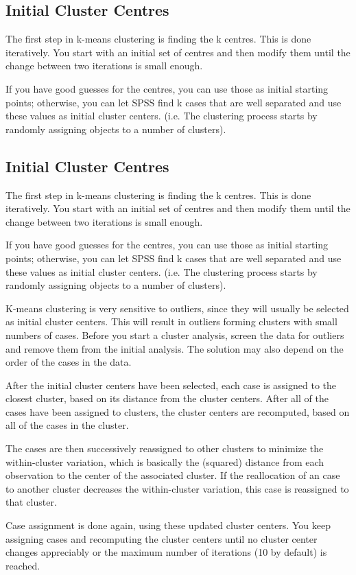 \subsection{Initial Cluster Centres}
The first step in k-means clustering is finding the k centres. This is done iteratively. 
You start with an initial set of centres and then modify them until the change between two iterations is small enough.

If you have good guesses for the centres, you can use those
as initial starting points; otherwise, you can let SPSS find k cases that are well separated and use these values 
as initial cluster centers. (i.e. The clustering process starts by randomly assigning objects to a number of
clusters).

\subsection{Initial Cluster Centres}
The first step in k-means clustering is finding the k centres. This is done iteratively. 
You start with an initial set of centres and then modify them until the change between two iterations is small enough.

If you have good guesses for the centres, you can use those
as initial starting points; otherwise, you can let SPSS find k cases that are well separated and use these values 
as initial cluster centers. (i.e. The clustering process starts by randomly assigning objects to a number of
clusters).



K-means clustering is very sensitive to outliers, since they will usually be selected as initial cluster centers. 
This will result in outliers forming clusters with small numbers of cases. Before you start a cluster analysis, 
screen the data for outliers and remove them from the initial analysis. The solution may also depend on the order 
of the cases in the data.

After the initial cluster centers have been selected, each case is assigned to the closest
cluster, based on its distance from the cluster centers. After all of the cases have been
assigned to clusters, the cluster centers are recomputed, based on all of the cases in the
cluster.

The cases are then successively reassigned to other clusters to minimize the within-cluster variation, 
which is basically the (squared) distance from each observation to the center of the associated cluster. 
If the reallocation of an case to another cluster decreases the within-cluster variation, this case is reassigned
to that cluster.

Case assignment is done again, using these updated cluster centers. You keep
assigning cases and recomputing the cluster centers until no cluster center changes
appreciably or the maximum number of iterations (10 by default) is reached.
\newpage

